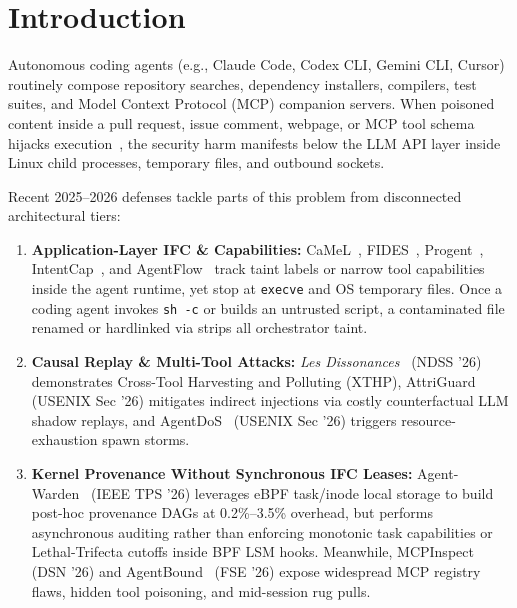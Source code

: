 \documentclass[10pt,twocolumn,letterpaper]{article}
\newcommand{\code}[1]{\texttt{\small #1}}
\begin{document}
\section{Introduction}

Autonomous coding agents (e.g., Claude Code, Codex CLI, Gemini CLI, Cursor) routinely compose repository searches, dependency installers, compilers, test suites, and Model Context Protocol (MCP) companion servers. When poisoned content inside a pull request, issue comment, webpage, or MCP tool schema hijacks execution~\cite{injecagent2024,agentdojo2024,xthp2026}, the security harm manifests below the LLM API layer inside Linux child processes, temporary files, and outbound sockets.

Recent 2025--2026 defenses tackle parts of this problem from disconnected architectural tiers:
\begin{enumerate}
  \item \textbf{Application-Layer IFC \& Capabilities:} CaMeL~\cite{camel2025}, FIDES~\cite{fides2025}, Progent~\cite{progent2025}, IntentCap~\cite{intentcap2026}, and AgentFlow~\cite{agentflow2026} track taint labels or narrow tool capabilities inside the agent runtime, yet stop at \code{execve} and OS temporary files. Once a coding agent invokes \code{sh -c} or builds an untrusted script, a contaminated file renamed or hardlinked via  strips all orchestrator taint.
  \item \textbf{Causal Replay \& Multi-Tool Attacks:} \emph{Les Dissonances}~\cite{xthp2026} (NDSS '26) demonstrates Cross-Tool Harvesting and Polluting (XTHP), AttriGuard~\cite{attriguard2026} (USENIX Sec '26) mitigates indirect injections via costly counterfactual LLM shadow replays, and AgentDoS~\cite{agentdos2026} (USENIX Sec '26) triggers resource-exhaustion spawn storms.
  \item \textbf{Kernel Provenance Without Synchronous IFC Leases:} Agent-Warden~\cite{agentwarden2026} (IEEE TPS '26) leverages eBPF task/inode local storage to build post-hoc provenance DAGs at 0.2\%--3.5\% overhead, but performs asynchronous auditing rather than enforcing monotonic task capabilities or Lethal-Trifecta cutoffs inside BPF LSM hooks. Meanwhile, MCPInspect~\cite{mcpinspect2026} (DSN '26) and AgentBound~\cite{agentbound2026} (FSE '26) expose widespread MCP registry flaws, hidden tool poisoning, and mid-session rug pulls.
\end{enumerate}
\end{document}
